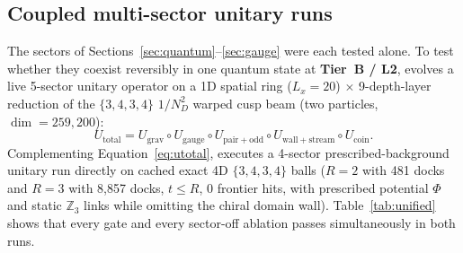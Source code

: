 \subsection{Coupled multi-sector unitary runs}

The sectors of Sections~\ref{sec:quantum}--\ref{sec:gauge} were each tested alone. To test whether they coexist
reversibly in one quantum state at \textbf{Tier~B / L2},  evolves a live 5-sector unitary operator on a 1D spatial ring
($L_x = 20$) $\times$ 9-depth-layer reduction of the $\{3,4,3,4\}$ $1/N_D^2$ warped cusp beam (two particles,
$\dim = 259{,}200$):
\begin{equation}
U_{\mathrm{total}} = U_{\mathrm{grav}} \circ U_{\mathrm{gauge}} \circ U_{\mathrm{pair+odd}} \circ U_{\mathrm{wall+stream}} \circ U_{\mathrm{coin}}.
\label{eq:utotal}
\end{equation}
Complementing Equation~\eqref{eq:utotal},  executes a 4-sector prescribed-background unitary run
directly on cached exact 4D $\{3,4,3,4\}$ balls ($R = 2$ with 481 docks and $R = 3$ with 8,857 docks, $t \le R$, 0
frontier hits, with prescribed potential $\Phi$ and static $\mathbb{Z}_3$ links while omitting the chiral domain wall).
Table~\ref{tab:unified} shows that every gate and every sector-off ablation passes simultaneously in both runs.


